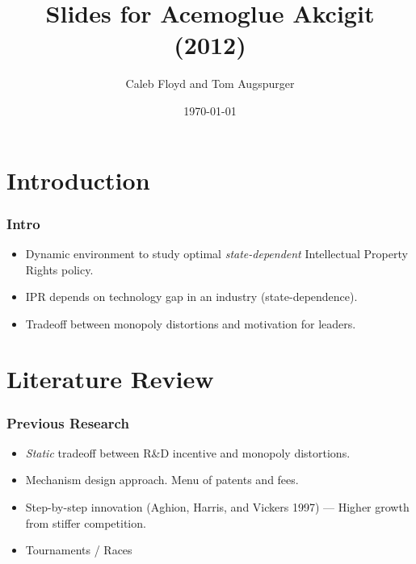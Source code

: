 \documentclass{beamer}
\title{Slides for Acemoglue Akcigit (2012)}
\author{Caleb Floyd and Tom Augspurger}
\date{\today}
\begin{document}
\frame{\titlepage}




\section{Introduction}
\label{sec:introduction}

\begin{frame}[t]\frametitle{Intro}
  \begin{itemize}
    \item<+-> Dynamic environment to study optimal \emph{state-dependent} Intellectual Property Rights policy.
    \item<+-> IPR depends on technology gap in an industry (state-dependence).
    \item<+-> Tradeoff between monopoly distortions and motivation for leaders.
  \end{itemize}
\end{frame}

\section{Literature Review}
\label{sec:literature_review}
\begin{frame}[t]\frametitle{Previous Research} 
  \begin{itemize}
    \item<+-> \emph{Static} tradeoff between R\&D incentive and monopoly distortions.
    \item<+-> Mechanism design approach.  Menu of patents and fees.
    \item<+-> Step-by-step innovation (Aghion, Harris, and Vickers 1997) --- Higher growth from stiffer competition.
    \item<+-> Tournaments / Races
  \end{itemize}
\end{frame}
\end{document}
